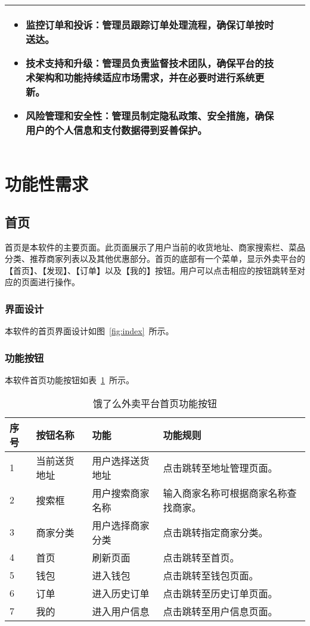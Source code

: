 \begin{table}[htbp]
\begin{tabularx}{\textwidth}{llX}
\begin{itemize}
    \item{\textbf{监控订单和投诉}}：管理员跟踪订单处理流程，确保订单按时送达。
    \item{\textbf{技术支持和升级}}：管理员负责监督技术团队，确保平台的技术架构和功能持续适应市场需求，并在必要时进行系统更新。
    \item {\textbf{风险管理和安全性}}：管理员制定隐私政策、安全措施，确保用户的个人信息和支付数据得到妥善保护。
\end{itemize}
\\
\bottomrule[1.5pt]
\end{tabularx}
\vspace{\baselineskip}
\end{table}

\section{功能性需求}
\subsection{首页}
首页是本软件的主要页面。此页面展示了用户当前的收货地址、商家搜索栏、菜品分类、推荐商家列表以及其他优惠部分。首页的底部有一个菜单，显示外卖平台的【首页】、【发现】、【订单】以及【我的】按钮。用户可以点击相应的按钮跳转至对应的页面进行操作。
\subsubsection{界面设计}
本软件的首页界面设计如图~\ref{fig:index}~所示。
\subsubsection{功能按钮}
本软件首页功能按钮如表~\ref{tab:table2}~所示。
\begin{table}[htbp]
    \caption{饿了么外卖平台首页功能按钮}\label{tab:table2}
    \vspace{0.5em}\wuhao
    \begin{tabularx}{\textwidth}{lllX}
    \toprule[1.5pt]
    序号 & 按钮名称 & 功能 & 功能规则 \\ 
    \midrule[1pt]
    1 & 当前送货地址 & 用户选择送货地址 & 点击跳转至地址管理页面。 \\
    2 & 搜索框 & 用户搜索商家名称 & 输入商家名称可根据商家名称查找商家。 \\
    3 & 商家分类 & 用户选择商家分类 & 点击跳转指定商家分类。 \\
    4 & 首页 & 刷新页面 & 点击跳转至首页。 \\
    5 & 钱包 & 进入钱包 & 点击跳转至钱包页面。 \\
    6 & 订单 & 进入历史订单 & 点击跳转至历史订单页面。 \\
    7 & 我的 & 进入用户信息 & 点击跳转至用户信息页面。 \\
\bottomrule[1.5pt]
\end{tabularx}
\vspace{\baselineskip}
\end{table}

